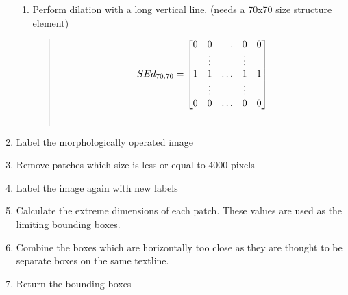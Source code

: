 \documentclass[letterpaper,10pt,english]{sphinxmanual}
\begin{document}
\begin{fulllineitems}
\begin{fulllineitems}
\begin{enumerate}
\begin{enumerate}
\item {} 
Perform dilation with a long vertical line. (needs a 70x70 size structure element)
\begin{quote}
\begin{gather}
\begin{split}SEd_{70,70} = 
\begin{bmatrix}
        0 & 0 & \dots & 0 & 0 \\
          & \vdots & & \vdots & \\
        1 & 1 & \dots & 1 & 1 \\
          & \vdots & & \vdots & \\
        0 & 0 & \dots & 0 & 0
\end{bmatrix}\end{split}\notag\\\begin{split}\end{split}\notag
\end{gather}\end{quote}

\end{enumerate}

\item {} 
Label the morphologically operated image

\item {} 
Remove patches which size is less or equal to 4000 pixels

\item {} 
Label the image again with new labels

\item {} 
Calculate the extreme dimensions of each patch. These values are used as the limiting bounding boxes.

\item {} 
Combine the boxes which are horizontally too close as they are thought to be separate boxes on the same textline.

\item {} 
Return the bounding boxes

\end{enumerate}

\end{fulllineitems}



\end{fulllineitems}
\end{document}
